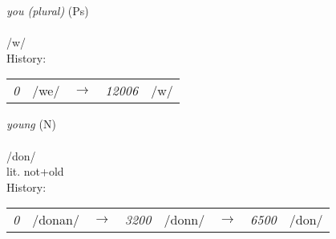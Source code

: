 \vspace{15pt}
\begin{nopagebreak}
 \textit{you (plural)} (Ps)\\
\\
\noindent /w/\\


\noindent History:

\vspace{-0pt}
\hspace{40pt}
\begin{tabular}{ccc}
\textit{0} & /we/&$\rightarrow$ & \textit{12006} & /w/& \\
\end{tabular}

\vspace{20pt}\hline

\end{nopagebreak}
\filbreak



\vspace{15pt}
\begin{nopagebreak}
 \textit{young} (N)\\
\\
\noindent /d{\textprimstress}on/\\
\noindent lit. not+old\\


\noindent History:

\vspace{-0pt}
\hspace{40pt}
\begin{tabular}{ccc}
\textit{0} & /donan/&$\rightarrow$ & \textit{3200} & /donn/&$\rightarrow$ & \textit{6500} & /don/& \\
\end{tabular}

\vspace{20pt}\hline

\end{nopagebreak}
\filbreak



\onecolumn
